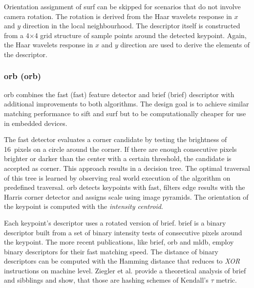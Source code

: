 Orientation assignment of \acrshort{surf} can be skipped for scenarios that do not involve camera rotation.
The rotation is derived from the Haar wavelets response in $x$ and $y$ direction in the local neighbourhood.
The descriptor itself is constructed from a 4$\times$4 grid structure of sample points around the detected keypoint.
Again, the Haar wavelets response in $x$ and $y$ direction are used to derive the elements of the descriptor.

\subsubsection{\acrshort{orb} (\acrlong{orb})}

\acrshort{orb}\cite{rublee_iccv11} combines the \acrshort{fast}\cite{rosten_eccv06} (\acrlong{fast}) feature detector and \acrshort{brief}\cite{calonder_eccv10} (\acrlong{brief}) descriptor with additional improvements to both algorithms.
The design goal is to achieve similar matching performance to \acrshort{sift} and \acrshort{surf} but to be computationally cheaper for use in embedded devices.

The \acrshort{fast} detector evaluates a corner candidate by testing the brightness of 16~pixels on a circle around the corner.
If there are enough consecutive pixels brighter or darker than the center with a certain threshold, the candidate is accepted as corner.
This approach results in a decision tree.
The optimal traversal of this tree is learned by observing real world execution of the algorithm on predefined traversal.
\acrshort{orb} detects keypoints with \acrshort{fast}, filters edge results with the Harris corner detector\cite{harris_1988} and assigns scale using image pyramids.
The orientation of the keypoint is computed with the \emph{intensity centroid}\cite{rosin_cviu99}.

Each keypoint's descriptor uses a rotated version of \acrshort{brief}.
\acrshort{brief} is a binary descriptor built from a set of binary intensity tests of consecutive pixels around the keypoint.
The more recent publications, like \acrshort{brief}, \acrshort{orb} and \acrshort{mldb}, employ binary descriptors for their fast matching speed.
The distance of binary descriptors can be computed with the Hamming distance that reduces to \emph{XOR} instructions on machine level.
Ziegler et al.\cite{ziegler_anips2012} provide a theoretical analysis of \acrshort{brief} and sibblings and show, that those are hashing schemes of Kendall's $\tau$ metric\cite{kendall_1938}.

